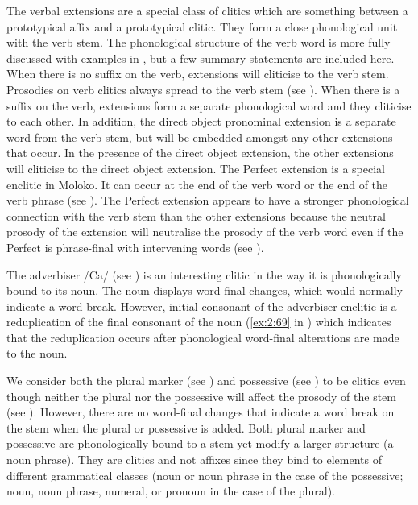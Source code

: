 The verbal extensions are a special class of clitics which are something between a prototypical affix and a prototypical clitic. They form a close phonological unit with the verb stem. The phonological structure of the verb word is more fully discussed with examples in , but a few summary statements are included here. When there is no suffix on the verb, extensions will cliticise to the verb stem. Prosodies on verb clitics always spread to the verb stem (see ).  When there is a suffix on the verb, extensions form a \nohyphens{separate} phonological word and they cliticise to each other. In addition, the direct object pronominal extension is a separate word from the verb stem, but will be embedded amongst any other extensions that occur. In the presence of the direct object extension, the other extensions will cliticise to the direct object extension. The Perfect extension is a special enclitic in Moloko. It can occur at the end of the verb word or the end of the verb phrase (see ).  The Perfect extension appears to have a stronger phonological connection with the verb stem than the other extensions because the neutral prosody of the extension will neutralise the prosody of the verb word even if the Perfect is phrase-final with intervening words (see ).  

The adverbiser /Ca/ (see ) is an interesting clitic in the way it is phonologically bound to its noun. The noun displays word-final changes, which would normally indicate a word break. However, initial consonant of the adverbiser enclitic is a reduplication of the final consonant of the noun (\ref{ex:2:69} in ) which indicates that the reduplication occurs after phonological word-final alterations are made to the noun. 

We consider both the plural marker (see ) and possessive (see ) to be clitics even though neither the plural nor the possessive will affect the prosody of the stem (see ). However, there are no word-final changes that indicate a word break on the stem when the plural or possessive is added. Both plural marker and possessive are phonologically bound to a stem yet modify a larger structure (a noun phrase). They are clitics and not affixes since they bind to elements of different grammatical classes (noun or noun phrase in the case of the possessive; noun, noun phrase, numeral, or pronoun in the case of the plural). 
